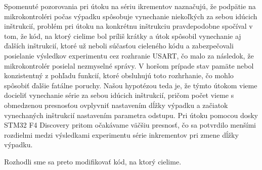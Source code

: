 Spomenuté pozorovania pri útoku na sériu ikrementov naznačujú, že podpätie na mikrokontroléri počas výpadku spôsobuje vynechanie niekoľkých za sebou idúcich inštrukcií, problém pri útoku na konkrétnu inštrukciu pravdepodobne spočíval v tom, že kód, na ktorý cielime bol príliš krátky a útok spôsobil vynechanie aj ďalších inštrukcií, ktoré už neboli súčasťou cieleného kódu a zabezpečovali posielanie výsledkov experimentu cez rozhranie USART, čo malo za následok, že mikrokontrolér posielal nezmyselné správy. V horšom prípade stav pamäte nebol konzistentný z pohľadu funkcií, ktoré obsluhujú toto rozhrhanie, čo mohlo spôsobiť ďalšie fatálne poruchy. Našou hypotézou teda je, že týmto útokom vieme docieliť vynechanie série za sebou idúcich inštrukcií, pričom počet vieme s obmedzenou presnosťou ovplyvniť nastavením dĺžky výpadku a začiatok vynechaných inštrukcií nastavením parametra odstupu. Pri útoku pomocou dosky STM32 F4 Discovery pritom očakávame väčšiu presnosť, čo sa potvrdilo menšími rozdielmi medzi výsledkami experimentu série inkrementov pri zmene dĺžky výpadku.

Rozhodli sme sa preto modifikovať kód, na ktorý cielime.